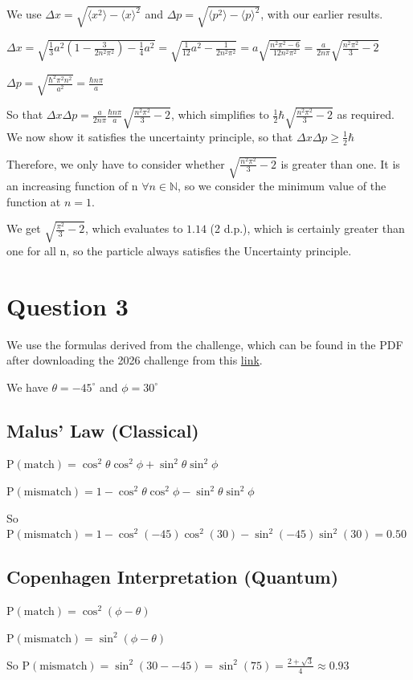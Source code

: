\documentclass{article}
\newcommand{\Prob}{\mathrm{P}}
\begin{document}
We use $\Delta x = \sqrt{\langle x^2\rangle - \langle x \rangle^2}$ and $\Delta p = \sqrt{\langle p^2\rangle - \langle p \rangle^2}$, with our earlier results.

$\Delta x= \sqrt{\frac{1}{3}a^2(1-\frac{3}{2n^2\pi ^2}) -\frac{1}{4}a^2} = \sqrt{\frac{1}{12}a^2 - \frac{1}{2n^2\pi^2}} = a\sqrt{\frac{n^2\pi^2 - 6}{12n^2\pi^2}} = \frac{a}{2n\pi}\sqrt{\frac{n^2\pi^2}{3} - 2}$

$\Delta p= \sqrt{\frac{\hbar^2\pi^2n^2}{a^2}} = \frac{\hbar n \pi}{a}$

So that $\Delta x \Delta p = \frac{a}{2n\pi}\frac{\hbar n \pi}{a}\sqrt{\frac{n^2\pi^2}{3} - 2}$, which simplifies to $\frac{1}{2}\hbar \sqrt{\frac{n^2\pi^2}{3} - 2}$ as required.
\\

We now show it satisfies the uncertainty principle, so that $\Delta x \Delta p \geq \frac{1}{2}\hbar$

Therefore, we only have to consider whether $\sqrt{\frac{n^2\pi^2}{3} - 2}$ is greater than one. It is an increasing function of n $\forall n \in \mathbb{N}$, so we consider the minimum value of the function at $n = 1$. 

We get $\sqrt{\frac{\pi^2}{3} - 2}$, which evaluates to $1.14$ (2 d.p.), which is certainly greater than one for all n, so the particle always satisfies the Uncertainty principle.

\section{Question 3}

We use the formulas derived from the challenge, which can be found in the PDF after downloading the 2026 challenge from this \href{https://eclecticon.info/physics_bpho_compphys.htm}{link}.

We have $\theta = -45^\circ$ and $\phi=30^\circ$

\subsection*{Malus' Law (Classical)}

$\Prob(\text{match}) = \cos^2\theta \cos^2\phi + \sin^2\theta \sin^2\phi$
\noindent

$\Prob(\text{mismatch}) = 1 - \cos^2\theta \cos^2\phi - \sin^2\theta \sin^2\phi$

So $\Prob(\text{mismatch}) = 1 - \cos^2(-45) \cos^2(30) - \sin^2(-45) \sin^2(30) = 0.50$

\subsection*{Copenhagen Interpretation (Quantum)}

$\Prob(\text{match}) = \cos^2({\phi-\theta})$

$\Prob(\text{mismatch}) = \sin^2({\phi-\theta})$

So $\Prob(\text{mismatch}) = \sin^2({30- -45}) = \sin^2(75) = \frac{2+\sqrt{3}}{4} \approx 0.93$
\end{document}
